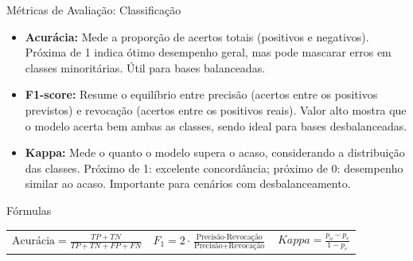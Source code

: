 \documentclass[aspectratio=169]{beamer}
\begin{document}
\begin{frame}{Métricas de Avaliação: Classificação}
  \begin{itemize}
    \item \textbf{Acurácia:} Mede a proporção de acertos totais (positivos e negativos). Próxima de 1 indica ótimo desempenho geral, mas pode mascarar erros em classes minoritárias. Útil para bases balanceadas.
    \item \textbf{F1-score:} Resume o equilíbrio entre precisão (acertos entre os positivos previstos) e revocação (acertos entre os positivos reais). Valor alto mostra que o modelo acerta bem ambas as classes, sendo ideal para bases desbalanceadas.
    \item \textbf{Kappa:} Mede o quanto o modelo supera o acaso, considerando a distribuição das classes. Próximo de 1: excelente concordância; próximo de 0: desempenho similar ao acaso. Importante para cenários com desbalanceamento.
  \end{itemize}
  \vspace{0.5em}
  \begin{block}{Fórmulas}
    \begin{center}
      \large
      \begin{tabular}{ccc}
        $\text{Acurácia} = \frac{TP + TN}{TP + TN + FP + FN}$ &
        $F_1 = 2 \cdot \frac{\text{Precis\~ao} \cdot \text{Revoca\c{c}\~ao}}{\text{Precis\~ao} + \text{Revoca\c{c}\~ao}}$ &
        $Kappa = \frac{p_o - p_e}{1 - p_e}$
      \end{tabular}
    \end{center}
  \end{block}
\end{frame}
\end{document}
